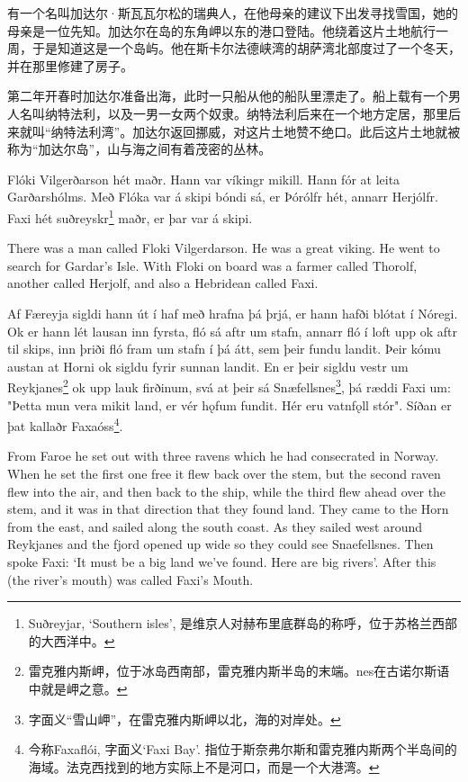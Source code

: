 \begin{translation*}{}
    有一个名叫加达尔·斯瓦瓦尔松的瑞典人，在他母亲的建议下出发寻找雪国，她的母亲是一位先知。加达尔在岛的东角岬以东的港口登陆。他绕着这片土地航行一周，于是知道这是一个岛屿。他在斯卡尔法德峡湾的胡萨湾北部度过了一个冬天，并在那里修建了房子。

    第二年开春时加达尔准备出海，此时一只船从他的船队里漂走了。船上载有一个男人名叫纳特法利，以及一男一女两个奴隶。纳特法利后来在一个地方定居，那里后来就叫“纳特法利湾”。加达尔返回挪威，对这片土地赞不绝口。此后这片土地就被称为“加达尔岛”，山与海之间有着茂密的丛林。
\end{translation*}
\begin{paracol}{2}
    Flóki Vilgerðarson hét maðr. Hann var víkingr mikill. Hann fór at leita Garðarshólms. Með Flóka var á skipi bóndi sá, er Þórólfr hét, annarr Herjólfr. Faxi hét suðreyskr\footnote{Suðreyjar, `Southern isles', 是维京人对赫布里底群岛的称呼，位于苏格兰西部的大西洋中。} maðr, er þar var á skipi.

    \switchcolumn

    There was a man called Floki Vilgerdarson. He was a great viking. He went to search for Gardar's Isle. With Floki on board was a farmer called Thorolf, another called Herjolf, and also a Hebridean called Faxi.

    \switchcolumn*

    Af Færeyja sigldi hann út í haf með hrafna þá þrjá, er hann hafði blótat í Nóregi. Ok er hann lét lausan inn fyrsta, fló sá aftr um stafn, annarr fló í loft upp ok aftr til skips, inn þriði fló fram um stafn í þá átt, sem þeir fundu landit. Þeir kómu austan at Horni ok sigldu fyrir sunnan landit. En er þeir sigldu vestr um Reykjanes\footnote{雷克雅内斯岬，位于冰岛西南部，雷克雅内斯半岛的末端。nes在古诺尔斯语中就是岬之意。} ok upp lauk firðinum, svá at þeir sá Snæfellsnes\footnote{字面义“雪山岬”，在雷克雅内斯岬以北，海的对岸处。}, þá ræddi Faxi um: "Þetta mun vera mikit land, er vér hǫfum fundit. Hér eru vatnfǫll stór". Síðan er þat kallaðr Faxaóss\footnote{今称Faxaflói, 字面义`Faxi Bay'. 指位于斯奈弗尔斯和雷克雅内斯两个半岛间的海域。法克西找到的地方实际上不是河口，而是一个大港湾。}.

    \switchcolumn

    From Faroe he set out with three ravens which he had consecrated in Norway. When he set the first one free it flew back over the stem, but the second raven flew into the air, and then back to the ship, while the third flew ahead over the stem, and it was in that direction that they found land. They came to the Horn from the east, and sailed along the south coast. As they sailed west around Reykjanes and the fjord opened up wide so they could see Snaefellsnes. Then spoke Faxi: `It must be a big land we've found. Here are big rivers'. After this (the river's mouth) was called Faxi's Mouth.

\end{paracol}


